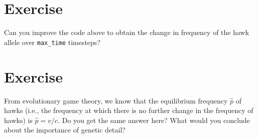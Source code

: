 \documentclass[
]{book}
\begin{document}
\hypertarget{exercise-3}{%
\section{Exercise}\label{exercise-3}}

Can you improve the code above to obtain the change in frequency of the hawk allele over \texttt{max\_time} timesteps?

\hypertarget{exercise-4}{%
\section{Exercise}\label{exercise-4}}

From evolutionary game theory, we know that the equilibrium frequency \(\hat{p}\) of hawks (i.e., the frequency at which there is no further change in the frequency of hawks) is \(\hat{p} = v/c\). Do you get the same answer here? What would you conclude about the importance of genetic detail?
\end{document}
